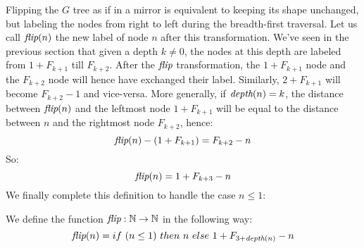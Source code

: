 \documentclass[a4paper,11pt]{article}
\begin{document}
Flipping the $G$ tree as if in a mirror is equivalent to keeping
its shape unchanged, but labeling the nodes from right to left
during the breadth-first traversal. Let us call $\textit{flip}(n)$ the
new label of node $n$ after this transformation.
We've seen in the previous section that given a depth $k\neq 0$,
the nodes at this depth are labeled from $1+F_{k+1}$ till $F_{k+2}$.
After the $\textit{flip}$ transformation, the $1+F_{k+1}$ node and
the $F_{k+2}$ node will hence have exchanged their label.
Similarly, $2+F_{k+1}$ will become $F_{k+2}-1$ and vice-versa.
More generally, if $\textit{depth}(n)=k$, the distance between
$\textit{flip}(n)$ and the leftmost node $1+F_{k+1}$ will be equal to
the distance between $n$ and the rightmost node $F_{k+2}$,
hence:
$$\textit{flip}(n) - (1+F_{k+1}) = F_{k+2} - n$$
So:
$$\textit{flip}(n) = 1+F_{k+3}-n$$
We finally complete this definition to handle the case $n\le 1$:
\begin{definition}
We define the function $\textit{flip} : \mathbb{N}\to\mathbb{N}$
in the following way:
$$\textit{flip}(n) = if~(n\le 1)~then~n~else~1+F_{3+\textit{depth}(n)}-n$$
\end{definition}
\end{document}
